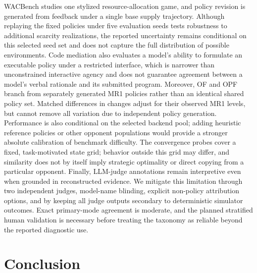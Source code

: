 \documentclass[letterpaper]{article} %
\begin{document}
WACBench studies one stylized resource-allocation game, and policy
revision is generated from feedback under a single base supply
trajectory. Although replaying the fixed policies under five evaluation
seeds tests robustness to additional scarcity realizations, the reported
uncertainty remains conditional on this selected seed set and does not
capture the full distribution of possible environments. Code mediation
also evaluates a model's ability to formulate an executable policy under
a restricted interface, which is narrower than unconstrained interactive
agency and does not guarantee agreement between a model's verbal rationale
and its submitted program. Moreover, OF and OPF branch from separately
generated MR1 policies rather than an identical shared policy set. Matched
differences in changes adjust for their observed MR1 levels, but cannot remove
all variation due to independent policy generation. Performance is also
conditional on the selected backend pool; adding heuristic reference policies
or other opponent populations would provide a stronger absolute calibration
of benchmark difficulty. The convergence probes cover a fixed,
task-motivated state grid;
behavior outside this grid may differ, and similarity does not by itself
imply strategic optimality or direct copying from a particular opponent.
Finally, LLM-judge annotations remain interpretive even when grounded in
reconstructed evidence. We mitigate this limitation through two independent
judges, model-name blinding, explicit non-policy attribution options, and by
keeping all judge outputs secondary to deterministic simulator outcomes.
Exact primary-mode agreement is moderate, and the planned stratified human
validation is necessary before treating the taxonomy as reliable beyond the
reported diagnostic use.

\section{Conclusion}
\end{document}
